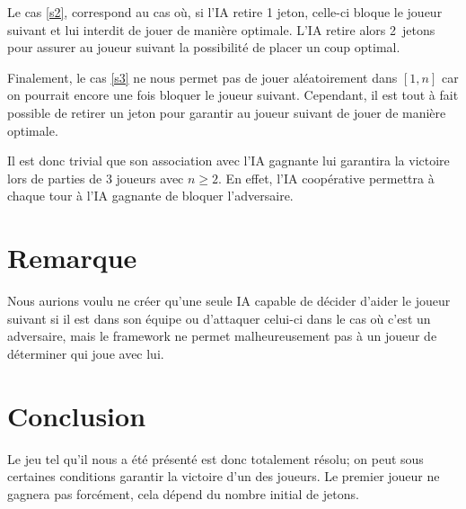 \documentclass[10pt,a4paper]{article}
\begin{document}
Le cas \eqref{s2}, correspond au cas où, si l'IA retire 1 jeton, celle-ci bloque
le joueur suivant et lui interdit de jouer de manière optimale.
L'IA retire alors 2~jetons pour assurer au joueur suivant la possibilité de
placer un coup optimal.

Finalement, le cas \eqref{s3} ne nous
permet pas de jouer aléatoirement dans $[1, n]$ car on pourrait encore une fois
bloquer le joueur suivant. Cependant, il est tout à fait possible de retirer un
jeton pour garantir au joueur suivant de jouer de manière optimale.

Il est donc trivial que son association avec l'IA gagnante lui garantira
la victoire lors de parties de 3 joueurs avec $n \geq 2$.  En effet,
l'IA coopérative permettra à chaque tour à l'IA gagnante de bloquer
l'adversaire.

\section{Remarque}
Nous aurions voulu ne créer qu'une seule IA capable de décider d'aider le joueur
suivant si il est dans son équipe ou d'attaquer celui-ci dans le cas où c'est
un adversaire, mais le framework ne permet malheureusement
pas à un joueur de déterminer qui joue avec lui.

\section{Conclusion}
Le jeu tel qu'il nous a été présenté est donc totalement résolu;
on peut sous certaines conditions garantir la victoire d'un des joueurs.
Le premier joueur ne gagnera pas forcément,
cela dépend du nombre initial de jetons.
\end{document}
